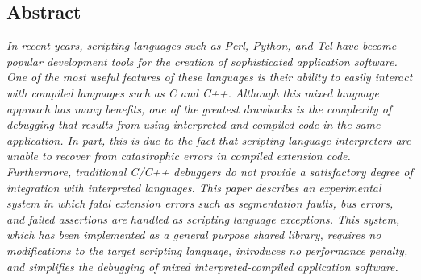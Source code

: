 \author{{David M.\ Beazley} \\
{\em Department of Computer Science} \\
{\em University of Chicago }\\
{\em Chicago, Illinois 60637 }\\
{\em beazley@cs.uchicago.edu }}

 

\maketitle

\thispagestyle{empty}


\subsection*{Abstract}
{\em
In recent years, scripting languages such as Perl, Python, and Tcl
have become popular development tools for the creation of
sophisticated application software.  One of the most useful features
of these languages is their ability to easily interact with compiled
languages such as C and C++.  Although this mixed language approach
has many benefits, one of the greatest drawbacks is the complexity of
debugging that results from using interpreted and compiled code in the
same application.  In part, this is due to the fact that scripting
language interpreters are unable to recover from catastrophic errors
in compiled extension code. Furthermore, traditional C/C++ debuggers
do not provide a satisfactory degree of integration with interpreted
languages.  This paper describes an experimental system in which fatal
extension errors such as segmentation faults, bus errors, and failed
assertions are handled as scripting language exceptions.  This system,
which has been implemented as a general purpose shared library,
requires no modifications to the target scripting language, introduces
no performance penalty, and simplifies the debugging of mixed
interpreted-compiled application software.
}

